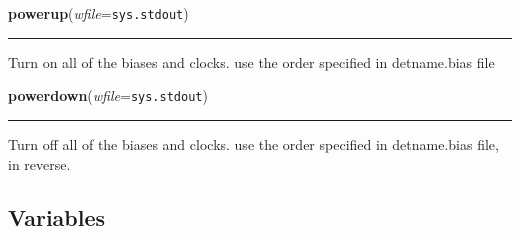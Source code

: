    \vspace{0.5ex}

    \begin{boxedminipage}{\textwidth}

    \raggedright \textbf{powerup}(\textit{wfile}=\texttt{sys.stdout})

    \vspace{-1.5ex}

    \rule{\textwidth}{0.5\fboxrule}
    Turn on all of the biases and clocks. use the order specified in 
    detname.bias file

    \vspace{1ex}

    \end{boxedminipage}

    \label{det:powerdown}

    \vspace{0.5ex}

    \begin{boxedminipage}{\textwidth}

    \raggedright \textbf{powerdown}(\textit{wfile}=\texttt{sys.stdout})

    \vspace{-1.5ex}

    \rule{\textwidth}{0.5\fboxrule}
    Turn off all of the biases and clocks. use the order specified in 
    detname.bias file, in reverse.

    \vspace{1ex}

    \end{boxedminipage}



  \subsection{Variables}


